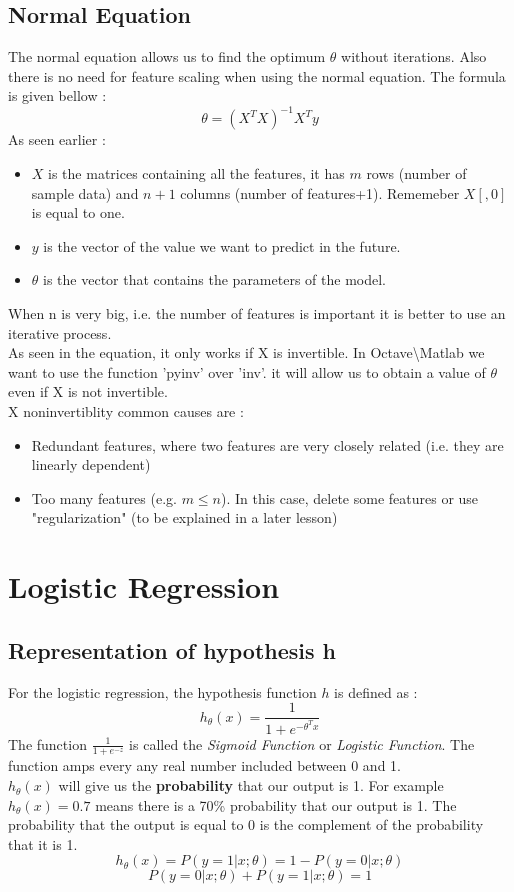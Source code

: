 \documentclass{article}
\begin{document}
\subsection{Normal Equation}
The normal equation allows us to find the optimum $\theta$ without iterations. Also there is no need for feature scaling when using the normal equation. The formula is given bellow :$$\theta = (X^{T}X)^{-1}X^{T}y$$
As seen earlier :
\begin{itemize}
	\item $X$ is the matrices containing all the features, it has $m$ rows (number of sample data) and $n+1$ columns (number of features+1). Rememeber $X[,0]$ is equal to one.
	\item  $y$ is the vector of the value we want to predict in the future.
	\item  $\theta$ is the vector that contains the parameters of the model.
\end{itemize}
When n is very big, i.e. the number of features is important it is better to use an iterative process.\\
As seen in the equation, it only works if X is invertible. In Octave\textbackslash Matlab we want to use the function 'pyinv' over 'inv'. it will allow us to obtain a value of $\theta$ even if X is not invertible.\\
X noninvertiblity common causes are :
\begin{itemize}
	\item Redundant features, where two features are very closely related (i.e. they are linearly dependent)
	\item Too many features (e.g. $m \leq n$). In this case, delete some features or use "regularization" (to be explained in a later lesson)
\end{itemize}

\section{Logistic Regression}

\subsection{Representation of hypothesis h}
For the logistic regression, the hypothesis function $h$ is defined as :
$$h_{\theta}(x) = \frac{1}{1 + e^{-\theta^{T}x}}$$
The function $\frac{1}{1 + e^{-z}}$ is called the \textit{Sigmoid Function} or \textit{Logistic Function}. The function amps every any real number included between 0 and 1.\\
$h_{\theta}(x)$ will give us the \textbf{probability} that our output is 1. For example $h_{\theta}(x) = 0.7$ means there is a 70\% probability that our output is 1. The probability that the output is equal to 0 is the complement of the probability that it is 1.
$$h_{\theta}(x) = P(y=1|x;\theta) = 1 - P(y=0|x;\theta)$$
$$P(y=0|x;\theta) + P(y=1|x;\theta) = 1$$
\end{document}
